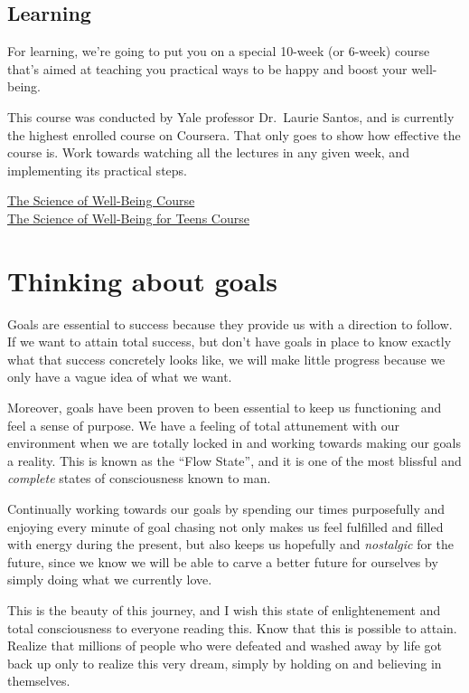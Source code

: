 \documentclass[
]{book}
\begin{document}
\hypertarget{learning}{%
\section{Learning}\label{learning}}

For learning, we're going to put you on a special 10-week (or 6-week) course that's aimed at teaching you practical ways to be happy and boost your well-being.

This course was conducted by Yale professor Dr.~Laurie Santos, and is currently the highest enrolled course on Coursera. That only goes to show how effective the course is. Work towards watching all the lectures in any given week, and implementing its practical steps.

\href{https://www.coursera.org/learn/the-science-of-well-being/home/week/1}{The Science of Well-Being Course}\\
\href{https://www.coursera.org/learn/the-science-of-well-being-for-teens/home/week/1}{The Science of Well-Being for Teens Course}

\hypertarget{thinking-about-goals}{%
\chapter{Thinking about goals}\label{thinking-about-goals}}

Goals are essential to success because they provide us with a direction to follow. If we want to attain total success, but don't have goals in place to know exactly what that success concretely looks like, we will make little progress because we only have a vague idea of what we want.

Moreover, goals have been proven to been essential to keep us functioning and feel a sense of purpose. We have a feeling of total attunement with our environment when we are totally locked in and working towards making our goals a reality. This is known as the ``Flow State'', and it is one of the most blissful and \emph{complete} states of consciousness known to man.

Continually working towards our goals by spending our times purposefully and enjoying every minute of goal chasing not only makes us feel fulfilled and filled with energy during the present, but also keeps us hopefully and \emph{nostalgic} for the future, since we know we will be able to carve a better future for ourselves by simply doing what we currently love.

This is the beauty of this journey, and I wish this state of enlightenement and total consciousness to everyone reading this. Know that this is possible to attain. Realize that millions of people who were defeated and washed away by life got back up only to realize this very dream, simply by holding on and believing in themselves.
\end{document}

